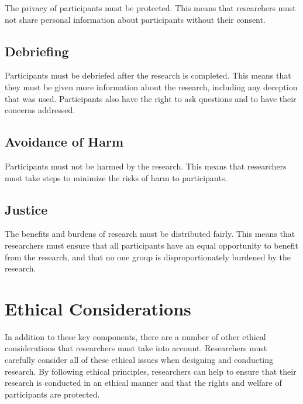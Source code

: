 \documentclass[
  b5paper]{book}
\begin{document}
The privacy of participants must be protected. This means that researchers must not share personal information about participants without their consent.

\hypertarget{debriefing}{%
\subsection*{Debriefing}\label{debriefing}}

Participants must be debriefed after the research is completed. This means that they must be given more information about the research, including any deception that was used. Participants also have the right to ask questions and to have their concerns addressed.

\hypertarget{avoidance-of-harm}{%
\subsection*{Avoidance of Harm}\label{avoidance-of-harm}}

Participants must not be harmed by the research. This means that researchers must take steps to minimize the risks of harm to participants.

\hypertarget{justice}{%
\subsection*{Justice}\label{justice}}

The benefits and burdens of research must be distributed fairly. This means that researchers must ensure that all participants have an equal opportunity to benefit from the research, and that no one group is disproportionately burdened by the research.

\hypertarget{ethical-considerations}{%
\section{Ethical Considerations}\label{ethical-considerations}}

In addition to these key components, there are a number of other ethical considerations that researchers must take into account. Researchers must carefully consider all of these ethical issues when designing and conducting research. By following ethical principles, researchers can help to ensure that their research is conducted in an ethical manner and that the rights and welfare of participants are protected.
\end{document}
